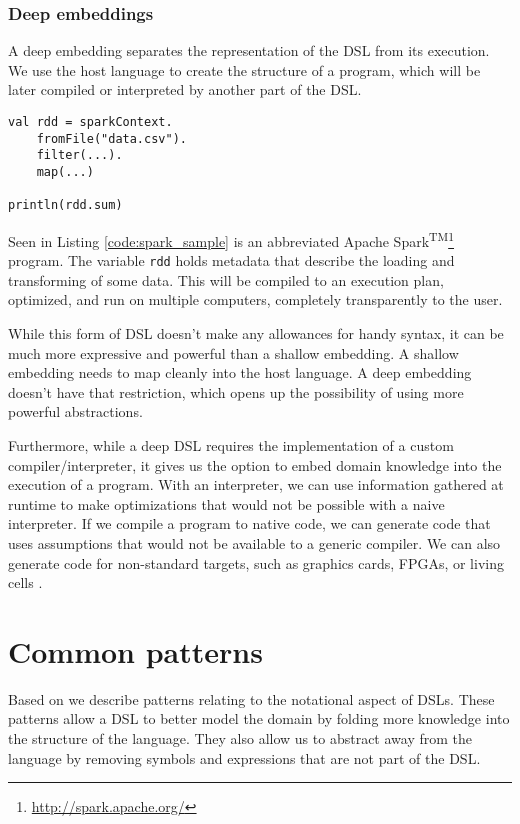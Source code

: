 \subsubsection{Deep embeddings}

A deep embedding separates the representation of the DSL from its execution.
We use the host language to create the structure of a program, which will be later compiled or interpreted by another part of the DSL.

\begin{lstlisting}[caption=Sample spark code, label=code:spark_sample]
val rdd = sparkContext.
	fromFile("data.csv").
	filter(...).
	map(...)

println(rdd.sum)
\end{lstlisting}

Seen in Listing \ref{code:spark_sample} is an abbreviated Apache Spark\textsuperscript{TM}\footnote{\url{http://spark.apache.org/}} program.
The variable \texttt{rdd} holds metadata that describe the loading and transforming of some data.
This will be compiled to an execution plan, optimized, and run on multiple computers, completely transparently to the user.

While this form of DSL doesn't make any allowances for handy syntax, it can be much more expressive and powerful than a shallow embedding.
A shallow embedding needs to map cleanly into the host language.
A deep embedding doesn't have that restriction, which opens up the possibility of using more powerful abstractions.

Furthermore, while a deep DSL requires the implementation of a custom compiler/interpreter, it gives us the option to embed domain knowledge into the execution of a program.
With an interpreter, we can use information gathered at runtime to make optimizations that would not be possible with a naive interpreter.
If we compile a program to native code, we can generate code that uses assumptions that would not be available to a generic compiler.
We can also generate code for non-standard targets, such as graphics cards, FPGAs, or living cells \autocite{Pedersen:2009}.

\section{Common patterns}

Based on \autocite{Gunther:2011} we describe patterns relating to the notational aspect of DSLs.
These patterns allow a DSL to better model the domain by folding more knowledge into the structure of the language.
They also allow us to abstract away from the language by removing symbols and expressions that are not part of the DSL.

